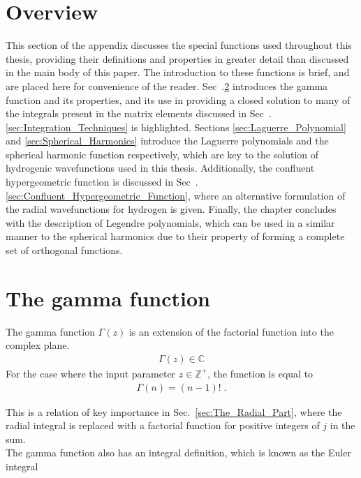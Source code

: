     \section{Overview}
        This section of the appendix discusses the special functions used throughout this thesis, providing their definitions and properties in greater detail than discussed in the main body of this paper. The introduction to these functions is brief, and are placed here for convenience of the reader. Sec~.\ref{sec:Gamma_Function} introduces the gamma function and its properties, and its use in providing a closed solution to many of the integrals present in the matrix elements discussed in Sec~.\ref{sec:Integration_Techniques} is highlighted. Sections \ref{sec:Laguerre_Polynomial} and \ref{sec:Spherical_Harmonics} introduce the Laguerre polynomials and the spherical harmonic function respectively, which are key to the solution of hydrogenic wavefunctions used in this thesis. Additionally, the confluent hypergeometric function is discussed in Sec~.\ref{sec:Confluent_Hypergeometric_Function}, where an alternative formulation of the radial wavefunctions for hydrogen is given. Finally, the chapter concludes with the description of Legendre polynomials, which can be used in a similar manner to the spherical harmonics due to their property of forming a complete set of orthogonal functions.
    \section{The gamma function} \label{sec:Gamma_Function}
        The gamma function $\Gamma(z)$ is an extension of the factorial function into the complex plane. 
        \begin{align}
            \Gamma(z) \in \mathbb{C} 
        \end{align}
        For the case where the input parameter $z \in \mathbb{Z}^+$, the function is equal to \cite{Arfken_Weber_Arfken_Weber_2008}
        \begin{align}
            \Gamma(n) = (n - 1)!\;.
        \end{align}

        \noindent This is a relation of key importance in Sec.~\ref{sec:The_Radial_Part}, where the radial integral is replaced with a factorial function for positive integers of $j$ in the sum.\\

        The gamma function also has an integral definition, which is known as the Euler integral

